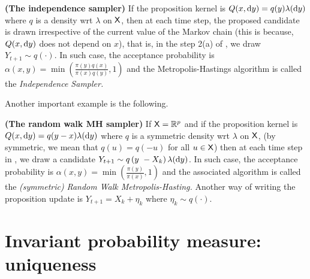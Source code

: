 \documentclass[english,graybox,envcountchap,envcountsame,sectrefs,shortlabels]{svmono}
\theoremstyle{style}
\begin{document}
\begin{example}
\textbf{(The independence sampler)} If the proposition kernel is $Q(x,\mathrm{d} y)=q(y)\lambda(\mathrm{d} y)$
where $q$ is a density wrt $\lambda$ on $\mathsf{X}$, then at each time
step, the proposed candidate is drawn irrespective of the current
value of the Markov chain (this is because, $Q(x,\mathrm{d} y)$ does not
depend on $x$), that is, in the step 2(a) of , we draw
$Y_{t+1}\sim q\left(\cdot\right)$. In such case, the acceptance probability
is $\alpha(x,y)=\min\left(\frac{\pi(y)q(x)}{\pi(x)q(y)},1\right)$
and the Metropolis-Hastings algorithm is called the \emph{Independence
Sampler. }
\end{example}
Another important example is the following.
\begin{example}
\textbf{(The random walk MH sampler)}  If $\mathsf{X}=\mathbb{R}^{p}$ and if
the proposition kernel is $Q(x,\mathrm{d} y)=q(y-x)\lambda(\mathrm{d} y)$ where
$q$ is a symmetric density wrt $\lambda$ on $\mathsf{X}$, (by symmetric,
we mean that $q(u)=q(-u)$ for all $u\in\mathsf{X}$) then at each time
step in , we draw a candidate $Y_{t+1}\sim q\left(y\ -X_{k}\right)\lambda(\mathrm{d} y)$.
In such case, the acceptance probability is $\alpha(x,y)=\min\left(\frac{\pi(y)}{\pi(x)},1\right)$
and the associated algorithm is called the \emph{(symmetric)} \emph{Random
Walk Metropolis-Hasting.}\textbf{ }Another way of writing the proposition
update is $Y_{t+1}=X_{k}+\eta_{k}$ where $\eta_{k}\sim q(\cdot)$.\textbf{ }
\end{example}

\section{Invariant probability measure: uniqueness}
\end{document}
